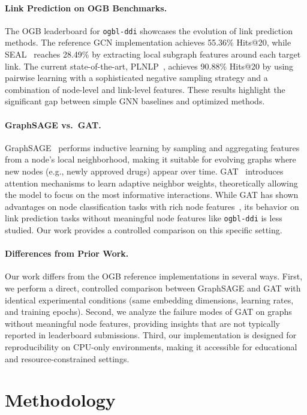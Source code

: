 \documentclass{article}
\begin{document}
\paragraph{Link Prediction on OGB Benchmarks.}
The OGB leaderboard for \texttt{ogbl-ddi} showcases the evolution of link prediction methods. The reference GCN implementation achieves 55.36\% Hits@20, while SEAL~\citep{zhang2018link} reaches 28.49\% by extracting local subgraph features around each target link. The current state-of-the-art, PLNLP~\citep{wang2021pairwise}, achieves 90.88\% Hits@20 by using pairwise learning with a sophisticated negative sampling strategy and a combination of node-level and link-level features. These results highlight the significant gap between simple GNN baselines and optimized methods.

\paragraph{GraphSAGE vs.\ GAT.}
GraphSAGE~\citep{hamilton2017inductive} performs inductive learning by sampling and aggregating features from a node's local neighborhood, making it suitable for evolving graphs where new nodes (e.g., newly approved drugs) appear over time. GAT~\citep{velickovic2018graph} introduces attention mechanisms to learn adaptive neighbor weights, theoretically allowing the model to focus on the most informative interactions. While GAT has shown advantages on node classification tasks with rich node features~\citep{velickovic2018graph}, its behavior on link prediction tasks without meaningful node features like \texttt{ogbl-ddi} is less studied. Our work provides a controlled comparison on this specific setting.

\paragraph{Differences from Prior Work.}
Our work differs from the OGB reference implementations in several ways. First, we perform a direct, controlled comparison between GraphSAGE and GAT with identical experimental conditions (same embedding dimensions, learning rates, and training epochs). Second, we analyze the failure modes of GAT on graphs without meaningful node features, providing insights that are not typically reported in leaderboard submissions. Third, our implementation is designed for reproducibility on CPU-only environments, making it accessible for educational and resource-constrained settings.


\section{Methodology}
\end{document}
